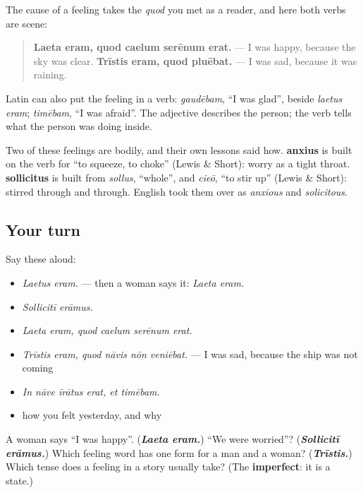 \begin{culture}
The cause of a feeling takes the \emph{quod} you met as a reader, and here both verbs are scene:

\begin{quote}
\textbf{Laeta eram, quod caelum serēnum erat.} — I was happy, because the sky was clear. \textbf{Trīstis eram, quod pluēbat.} — I was sad, because it was raining.
\end{quote}

Latin can also put the feeling in a verb: \emph{gaudēbam}, \textquotedblleft{}I was glad\textquotedblright{}, beside \emph{laetus eram}; \emph{timēbam}, \textquotedblleft{}I was afraid\textquotedblright{}. The adjective describes the person; the verb tells what the person was doing inside.
\end{culture}

\begin{cousinweb}
Two of these feelings are bodily, and their own lessons said how. \textbf{anxius} is built on the verb for \textquotedblleft{}to squeeze, to choke\textquotedblright{} (Lewis \& Short): worry as a tight throat. \textbf{sollicitus} is built from \emph{sollus}, \textquotedblleft{}whole\textquotedblright{}, and \emph{cieō}, \textquotedblleft{}to stir up\textquotedblright{} (Lewis \& Short): stirred through and through. English took them over as \emph{anxious} and \emph{solicitous}.
\end{cousinweb}

\subsection*{Your turn}
Say these aloud:

\begin{itemize}
\raggedright
  \item \emph{Laetus eram.} — then a woman says it: \emph{Laeta eram.}
  \item \emph{Sollicitī erāmus.}
  \item \emph{Laeta eram, quod caelum serēnum erat.}
  \item \emph{Trīstis eram, quod nāvis nōn veniēbat.} — I was sad, because the ship was not coming
  \item \emph{In nāve īrātus erat, et timēbam.}
  \item how you felt yesterday, and why
\end{itemize}

\begin{tcolorbox}[breakable,colback=teal!4,colframe=teal!35!black,title={Before you move on}]
A woman says \textquotedblleft{}I was happy\textquotedblright{}. (\emph{\textbf{Laeta eram.}}) \textquotedblleft{}We were worried\textquotedblright{}? (\emph{\textbf{Sollicitī erāmus.}}) Which feeling word has one form for a man and a woman? (\emph{\textbf{Trīstis.}}) Which tense does a feeling in a story usually take? (The \textbf{imperfect}: it is a state.)
\end{tcolorbox}

